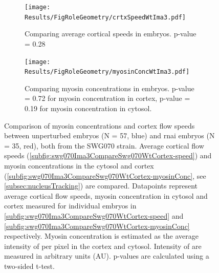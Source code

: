 \begin{figure}
\centering
\begin{subfigure}[t]{0.3\textwidth}
    \centering
    \texttt{[image: Results/FigRoleGeometry/crtxSpeedWtIma3.pdf]}
    \caption{Comparing average cortical speeds in embryos. p-value = \num{0.28}} 
    \label{subfig:swg070Ima3CompareSwg070WtCortex-speed}
\end{subfigure}
\begin{subfigure}[t]{0.3\textwidth}
    \centering
    \texttt{[image: Results/FigRoleGeometry/myosinConcWtIma3.pdf]}
    \caption{Comparing myosin concentrations in embryos. p-value = \num{0.72} for myosin concentration in cortex, p-value = \num{0.19} for myosin concentration in cytosol.} 
    \label{subfig:swg070Ima3CompareSwg070WtCortex-myosinConc}
\end{subfigure}
\caption[Comparing myosin concentrations and cortex flow speeds between unperturbed embryos and  \acs{rnai} embryos]{Comparison of myosin concentrations and cortex flow speeds between unperturbed embryos (N = 57, blue) and  \ac{rnai} embryos (N = 35, red), both from the SWG070 strain. Average cortical flow speeds (\autoref{subfig:swg070Ima3CompareSwg070WtCortex-speed}) and myosin concentrations in the cytosol and cortex (\autoref{subfig:swg070Ima3CompareSwg070WtCortex-myosinConc}, see \autoref{subsec:nucleusTracking}) are compared. Datapoints represent average cortical flow speeds, myosin concentration in cytosol and cortex measured for individual embryos in \autoref{subfig:swg070Ima3CompareSwg070WtCortex-speed} and \autoref{subfig:swg070Ima3CompareSwg070WtCortex-myosinConc} respectively. Myosin concentration is estimated as the average intensity of  per pixel in
the cortex and cytosol. Intensity of  are measured in arbitrary units (\si{AU}). p-values are calculated using a two-sided t-test.}
\label{fig:swg070Ima3CompareSwg070WtCortex}
\end{figure}

